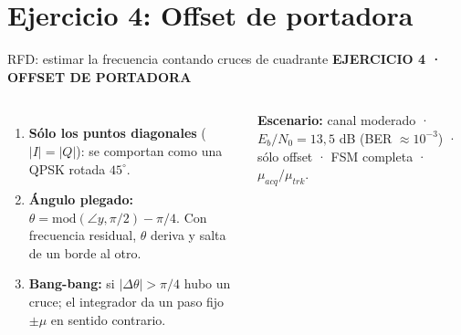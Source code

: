 \documentclass[aspectratio=169,11pt,t]{beamer}
\newcommand{\eyebrow}[1]{{\scriptsize\bfseries\color{rust}\MakeUppercase{#1}}\par\smallskip}
\begin{document}
\section{Ejercicio 4: Offset de portadora}

\begin{frame}{RFD: estimar la frecuencia contando cruces de cuadrante}
\eyebrow{Ejercicio 4 · Offset de portadora}
\begin{columns}[c]
  \centering
  \begin{enumerate}\small
    \item \textbf{Sólo los puntos diagonales} ($|I|=|Q|$): se comportan como una QPSK rotada $45^\circ$.
    \item \textbf{Ángulo plegado:} $\theta = \mathrm{mod}(\angle y,\pi/2) - \pi/4$. Con frecuencia residual, $\theta$ deriva y salta de un borde al otro.
    \item \textbf{Bang-bang:} si $|\Delta\theta| > \pi/4$ hubo un cruce; el integrador da un paso fijo $\pm\mu$ en sentido contrario.
  \end{enumerate}
  \medskip
  {\scriptsize\textbf{Escenario:} canal moderado · $E_b/N_0 = 13{,}5$ dB (BER $\approx 10^{-3}$) · sólo offset · FSM completa · $\mu_{acq}/\mu_{trk}$.}
\end{columns}
\end{frame}
\end{document}
